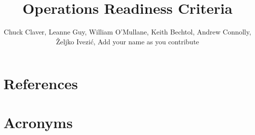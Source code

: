 \documentclass[SE,lsstdraft,authoryear,toc]{lsstdoc}
\title{Operations Readiness Criteria}
\author{%
Chuck Claver, Leanne Guy, William O'Mullane, Keith Bechtol, Andrew Connolly, \v{Z}eljko Ivezi\'{c}, Add your name as you contribute
}
\date{\vcsDate}
\begin{document}
\maketitle














\appendix
\section{References} \label{sec:bib}
\renewcommand{\refname}{} %


\section{Acronyms} \label{sec:acronyms}

\end{document}
